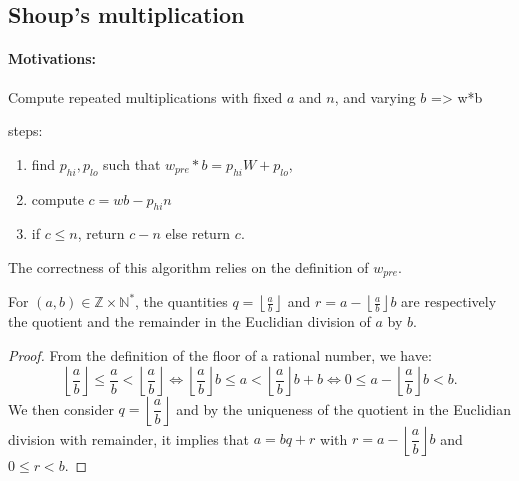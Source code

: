 \documentclass[a4paper]{article}
\begin{document}
\subsection{Shoup's multiplication}


\paragraph{Motivations:} Compute repeated multiplications with fixed $a$ and $n$, and varying $b$ => w*b

steps:
\begin{enumerate}
    \item find $p_{hi}, p_{lo}$ such that $w_{pre} * b = p_{hi}W + p_{lo}$,
    \item compute $c = wb - p_{hi}n$
    \item if $c \leq n$, return $c-n$ else return $c$.
\end{enumerate}

The correctness of this algorithm relies on the definition of $w_{pre}$. 

\begin{proposition}\label{prop:quorem}
For $(a,b) \in \mathbb{Z}\times \mathbb{N}^*$, the quantities $q=\left\lfloor\frac{a}{b}\right\rfloor$ and $r=a - \left\lfloor\frac{a}{b}\right\rfloor b$ are respectively the quotient and the remainder in the Euclidian division of $a$ by $b$.
\end{proposition}
    
\begin{proof}
From the definition of the floor of a rational number, we have:
\[
    \left\lfloor\dfrac{a}{b}\right\rfloor \leq \dfrac{a}{b} < \left\lfloor\dfrac{a}{b}\right\rfloor \Longleftrightarrow
    \left\lfloor\dfrac{a}{b}\right\rfloor b \leq a < \left\lfloor\dfrac{a}{b}\right\rfloor b + b \Longleftrightarrow
    0 \leq a - \left\lfloor\dfrac{a}{b}\right\rfloor b < b.
\]
We then consider $q=\left\lfloor\dfrac{a}{b}\right\rfloor$ and by the uniqueness of the quotient in the Euclidian division with remainder, it implies that $a = bq + r$ with $r=a - \left\lfloor\dfrac{a}{b}\right\rfloor b$ and $0 \leq r < b$.
\end{proof}
\end{document}
